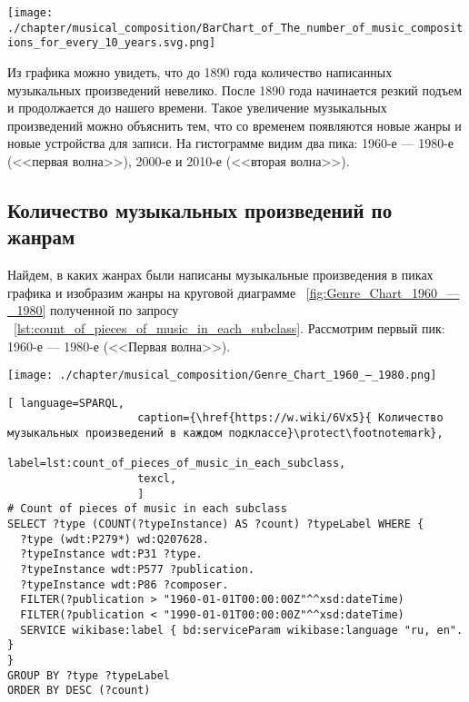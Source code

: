 \begin{marginfigure}[0\baselineskip]
	\texttt{[image: ./chapter/musical\_composition/BarChart\_of\_The\_number\_of\_music\_compositions\_for\_every\_10\_years.svg.png]}
	\caption[Гистограмма количества музыкальных композиций за каждые 10 лет с XIX века до настоящего времени]{Гистограмма количества музыкальных композиций за каждые 10 лет с XIX века до настоящего времени}%
	\label{fig:diagram_10_years}%
\end{marginfigure}
Из графика можно увидеть, что до 1890 года количество написанных музыкальных произведений невелико. После 1890 года начинается резкий подъем и продолжается до нашего времени. Такое увеличение музыкальных произведений можно объяснить тем, что со временем появляются новые жанры и новые устройства для записи. На гистограмме видим два пика: 1960-е — 1980-е (<<первая волна>>), 2000-е и 2010-е (<<вторая волна>>).


\subsection{Количество музыкальных произведений по жанрам}
Найдем, в каких жанрах были написаны музыкальные произведения в пиках графика и изобразим жанры на круговой диаграмме ~\ref{fig:Genre_Chart_1960_—_1980} полученной по запросу ~\ref{lst:count_of_pieces_of_music_in_each_subclass}. Рассмотрим первый пик: 1960-е — 1980-е (<<Первая волна>>).
\begin{marginfigure}[0\baselineskip]
	\texttt{[image: ./chapter/musical\_composition/Genre\_Chart\_1960\_—\_1980.png]}
	\caption[Круговая диаграмма музыкальных жанров за 1960-1980 годы во всем мире]{Круговая диаграмма музыкальных жанров за 1960-1980 годы во всем мире. Ссылка на SPARQL-запрос: \href{https://w.wiki/6Vx5}{https://w.wiki/6Vx5}.}%
	\label{fig:Genre_Chart_1960_—_1980}%
\end{marginfigure}
\begin{lstlisting}[ language=SPARQL,
                    caption={\href{https://w.wiki/6Vx5}{ Количество музыкальных произведений в каждом подклассе}\protect\footnotemark},
                    label=lst:count_of_pieces_of_music_in_each_subclass,
                    texcl,
                    ]
# Count of pieces of music in each subclass
SELECT ?type (COUNT(?typeInstance) AS ?count) ?typeLabel WHERE {
  ?type (wdt:P279*) wd:Q207628.
  ?typeInstance wdt:P31 ?type.
  ?typeInstance wdt:P577 ?publication.
  ?typeInstance wdt:P86 ?composer.
  FILTER(?publication > "1960-01-01T00:00:00Z"^^xsd:dateTime)        
  FILTER(?publication < "1990-01-01T00:00:00Z"^^xsd:dateTime)
  SERVICE wikibase:label { bd:serviceParam wikibase:language "ru, en". }
}
GROUP BY ?type ?typeLabel
ORDER BY DESC (?count)
\end{lstlisting}%

